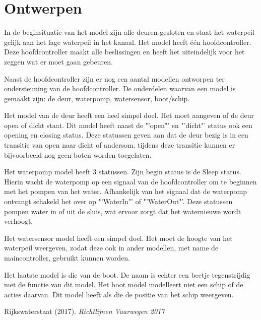 \documentclass{article}
\begin{document}
\section{Ontwerpen} %
In de beginsituatie van het model zijn alle deuren gesloten en staat het waterpeil gelijk aan het lage waterpeil in het kanaal. Het model heeft één hoofdcontroller. Deze hoofdcontroller maakt alle beslissingen en heeft het uiteindelijk voor het zeggen wat er moet gaan gebeuren.

Naast de hoofdcontroller zijn er nog een aantal modellen ontworpen ter ondersteuning van de hoofdcontroller. De onderdelen waarvan een model is gemaakt zijn: de deur, waterpomp, watersensor, boot/schip.


\vskip0.5cm

Het model van de deur heeft een heel simpel doel. Het moet aangeven of de deur open of dicht staat. Dit model heeft naast de "'open"' en "'dicht"' status ook een opening en closing status. Deze statussen geven aan dat de deur bezig is in een transitie van open naar dicht of andersom. tijdens deze transitie kunnen er bijvoorbeeld nog geen boten worden toegelaten.

\vskip0.5cm

Het waterpomp model heeft 3 statussen. Zijn begin status is de Sleep status. Hierin wacht de waterpomp op een signaal van de hoofdcontroller om te beginnen met het pompen van het water. Afhankelijk van het signaal dat de waterpomp ontvangt schakeld het over op "'WaterIn"' of "'WaterOut"'. Deze statussen pompen water in of uit de sluis, wat ervoor zorgt dat het waternieuwe wordt verhoogt.

Het watersensor model heeft een simpel doel. Het moet de hoogte van het waterpeil weergeven, zodat deze ook in ander modellen, met name de maincontroller, gebruikt kunnen worden.

Het laatste model is die van de boot. De naam is echter een beetje tegenstrijdig met de functie van dit model. Het boot model modelleert niet een schip of de acties daarvan. Dit model heeft als die de positie van het schip weergeven.



\clearpage %

\clearpage %
\begin{thebibliography}{9}
Rijkswaterstaat (2017).
\textit{Richtlijnen Vaarwegen 2017}\\

\end{thebibliography}
\end{document}
